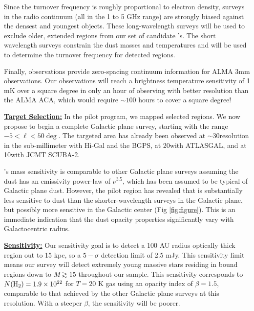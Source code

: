 \documentclass[11pt,preprint]{aastex_nofoot}
\begin{document}
Since the turnover frequency is roughly proportional to electron density,
surveys in the radio continuum (all in the 1 to 5 GHz range) are strongly
biased against the densest and youngest objects.  These long-wavelength surveys
will be used to exclude older, extended \uchii regions from our set of
candidate \hchii's.  The short wavelength surveys constrain the dust masses and
temperatures and will be used to determine the turnover frequency for detected
\hchii regions.

Finally, \MUSTANG observations provide zero-spacing
continuum information for ALMA 3mm observations.  Our observations will reach a
brightness temperature sensitivity of 1 mK over a square degree in only an hour
of observing with better resolution than the ALMA ACA, which would require
$\sim100$ hours to cover a square degree!  

\indent\underline{\textbf{\helv Target Selection:}}
In the pilot program, we mapped selected regions.  We now propose to begin a complete
Galactic plane survey, starting with the range $-5 < \ell < 50\deg$.
The targeted area has already been observed at $\sim$30\arcsec resolution in
the sub-millimeter with Hi-Gal and the BGPS, at 20\arcsec with ATLASGAL, and at
10\arcsec with JCMT SCUBA-2.  

\MUSTANG’s mass sensitivity is comparable to other Galactic plane surveys assuming the
dust has an emissivity power-law of $\nu^{3.5}$, which has been assumed to be
typical of Galactic plane
dust.  However, the pilot region has revealed that \MUSTANG is substantially
less sensitive to dust than the shorter-wavelength surveys in the Galactic plane,
but possibly more sensitive in the Galactic center (Fig \ref{fig:figure}).  This is an immediate
indication that the dust opacity properties significantly vary with Galactocentric
radius.

\indent\underline{\textbf{\helv Sensitivity:}}  Our sensitivity goal is to
detect a 100 AU radius optically thick \hii region out to 15 kpc, so a
$5-\sigma$ detection limit of 2.5 mJy.  This sensitivity limit means our survey
will detect extremely young massive stars residing in bound \hii regions down
to $M \gtrsim 15$ \msun throughout our sample.  This sensitivity corresponds to
$N(\textrm{H}_{2})=1.9\times10^{22}$ \persc for $T=20$ K gas using an opacity index of
$\beta=1.5$, comparable to that achieved by the other Galactic plane surveys at
this resolution.  With a steeper $\beta$, the sensitivity will be poorer.


\end{document}
